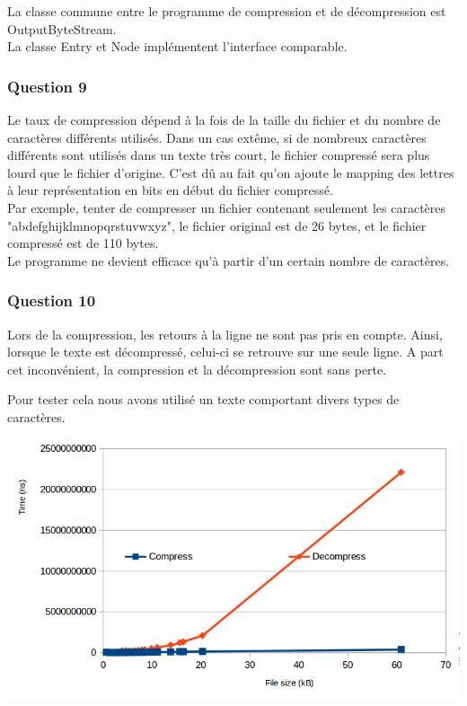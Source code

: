 \documentclass[a4paper]{article}
\begin{document}
La classe commune entre le programme de compression et de décompression est OutputByteStream. 
\\
La classe Entry et Node implémentent l'interface comparable. 
\subsubsection*{Question 9}
Le taux de compression dépend à la fois de la taille du fichier et du nombre de caractères différents utilisés. Dans un cas extême, si de nombreux caractères différents sont utilisés dans un texte très court, le fichier compressé sera plus lourd que le fichier d'origine. C'est dû au fait qu'on ajoute le mapping des lettres à leur représentation en bits en début du fichier compressé.\\

Par exemple, tenter de compresser un fichier contenant seulement les caractères "abdefghijklmnopqrstuvwxyz", le fichier original est de 26 bytes, et le fichier compressé est de 110 bytes. 
\\
Le programme ne devient efficace qu'à partir d'un certain nombre de caractères. 

\subsubsection*{Question 10}
Lors de la compression, les retours à la ligne ne sont pas pris en compte. Ainsi, lorsque le texte est décompressé, celui-ci se retrouve sur une seule ligne. A part cet inconvénient, la compression et la décompression sont sans perte. 

Pour tester cela nous avons utilisé un texte comportant divers types de caractères.

 

\begin{frame}
\centering
\includegraphics[scale=0.5]{graph}
\end{frame}
\end{document}
